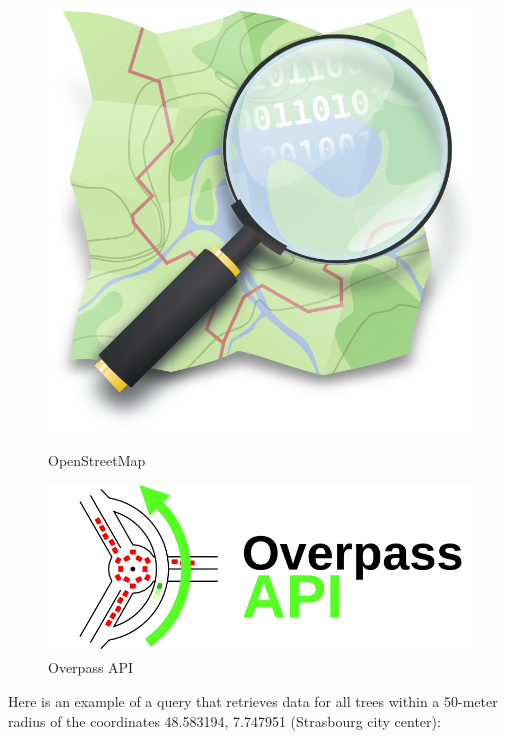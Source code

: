 \documentclass[12pt]{article}
\begin{document}
\begin{figure}[H]
    \centering
    \begin{minipage}{0.45\textwidth}
        \centering
        \includegraphics[width=\textwidth]{images/OSM_logo.png}
        \caption{OpenStreetMap \cite{openstreetmap}}
    \end{minipage}
    \begin{minipage}{0.45\textwidth}
        \centering
        \includegraphics[width=\textwidth]{images/OvAPI_logo.png}
        \caption{Overpass API \cite{overpass}}
    \end{minipage}\hfill
\end{figure}

\newpage
Here is an example of a query that retrieves data for all trees within a 50-meter
radius of the coordinates 48.583194, 7.747951 (Strasbourg city center):
\end{document}
